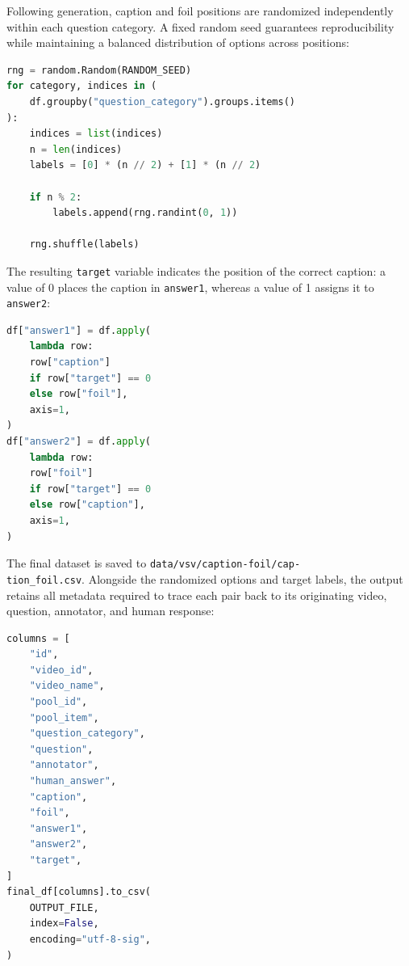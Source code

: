 Following generation, caption and foil positions are randomized independently within each question category. A fixed random seed guarantees reproducibility while maintaining a balanced distribution of options across positions:
\begin{lstlisting}[language=Python]
rng = random.Random(RANDOM_SEED)
for category, indices in (
    df.groupby("question_category").groups.items()
):
    indices = list(indices)
    n = len(indices)
    labels = [0] * (n // 2) + [1] * (n // 2)

    if n % 2:
        labels.append(rng.randint(0, 1))

    rng.shuffle(labels)
\end{lstlisting}
The resulting \texttt{target} variable indicates the position of the correct caption: a value of 0 places the caption in \texttt{answer1}, whereas a value of 1 assigns it to \texttt{answer2}:
\begin{lstlisting}[language=Python]
df["answer1"] = df.apply(
    lambda row:
    row["caption"]
    if row["target"] == 0
    else row["foil"],
    axis=1,
)
df["answer2"] = df.apply(
    lambda row:
    row["foil"]
    if row["target"] == 0
    else row["caption"],
    axis=1,
)
\end{lstlisting}
The final dataset is saved to \texttt{data/vsv/caption-foil/cap-\\tion\_foil.csv}. Alongside the randomized options and target labels, the output retains all metadata required to trace each pair back to its originating video, question, annotator, and human response:
\begin{lstlisting}[language=Python]
columns = [
    "id",
    "video_id",
    "video_name",
    "pool_id",
    "pool_item",
    "question_category",
    "question",
    "annotator",
    "human_answer",
    "caption",
    "foil",
    "answer1",
    "answer2",
    "target",
]
final_df[columns].to_csv(
    OUTPUT_FILE,
    index=False,
    encoding="utf-8-sig",
)
\end{lstlisting}


